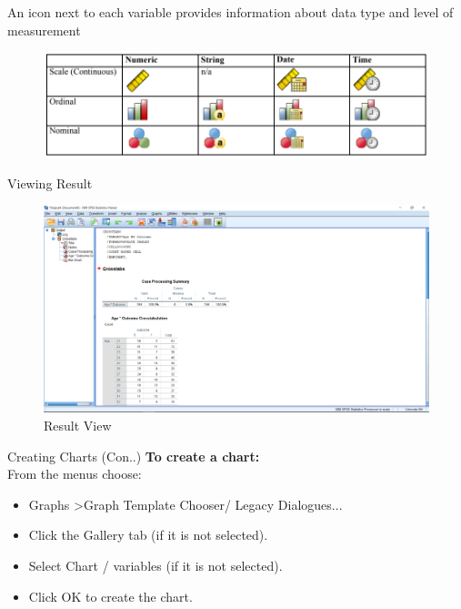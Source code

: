 \begin{frame}[t]{An icon next to each variable provides information about data type and level of measurement}
	\begin{figure}
		\centering
		\includegraphics[width=12cm]{img/level_of_measurement}
	\end{figure}
\end{frame}

\begin{frame}[t]{Viewing Result}
	\begin{figure}
		\centering
		\includegraphics[width=12cm]{img/cross_table3}
		\caption{Result View}
	\end{figure}
\end{frame}
\begin{frame}[t]{Creating Charts (Con..)}
	\textbf{To create a chart:}\\
	From the menus choose:\\
	\begin{itemize}
	\item Graphs \textgreater Graph Template Chooser/ Legacy Dialogues...
	\item Click the Gallery tab (if it is not selected).
	\item Select Chart / variables (if it is not selected).
	\item Click OK to create the chart.
	\end{itemize}
\end{frame}
